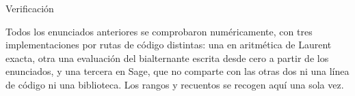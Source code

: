 \documentclass[11pt,reqno]{amsart}
\makeatletter
\renewcommand\section{\@startsection{section}{1}%
  \z@{\linespacing\@plus\linespacing}{.5\linespacing}%
  {\normalfont\large\bfseries\centering}}
\theoremstyle{plain}
\theoremstyle{definition}
\makeatother
\begin{document}
\section{Verificación}\label{sec:verif}

Todos los enunciados anteriores se comprobaron numéricamente, con tres implementaciones por rutas de
código distintas: una en aritmética de Laurent exacta, otra una evaluación del bialternante escrita
desde cero a partir de los enunciados, y una tercera en Sage, que no comparte con las otras dos ni
una línea de código ni una biblioteca. Los rangos y recuentos se recogen aquí una sola vez.

\begingroup\footnotesize\setlength{\tabcolsep}{4.0pt}
\end{document}
